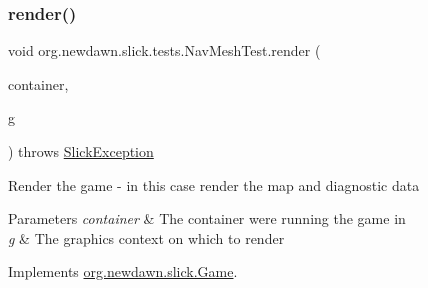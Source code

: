 \subsubsection{\texorpdfstring{render()}{render()}}
{\footnotesize\ttfamily void org.\+newdawn.\+slick.\+tests.\+Nav\+Mesh\+Test.\+render (\begin{DoxyParamCaption}\item[{\mbox{\hyperlink{classorg_1_1newdawn_1_1slick_1_1_game_container}{Game\+Container}}}]{container,  }\item[{\mbox{\hyperlink{classorg_1_1newdawn_1_1slick_1_1_graphics}{Graphics}}}]{g }\end{DoxyParamCaption}) throws \mbox{\hyperlink{classorg_1_1newdawn_1_1slick_1_1_slick_exception}{Slick\+Exception}}\hspace{0.3cm}{\ttfamily [inline]}}

Render the game -\/ in this case render the map and diagnostic data


\begin{DoxyParams}{Parameters}
{\em container} & The container we\textquotesingle{}re running the game in \\
\hline
{\em g} & The graphics context on which to render \\
\hline
\end{DoxyParams}


Implements \mbox{\hyperlink{interfaceorg_1_1newdawn_1_1slick_1_1_game_af1a4670d43eb3ba04dfcf55ab1975b64}{org.\+newdawn.\+slick.\+Game}}.


